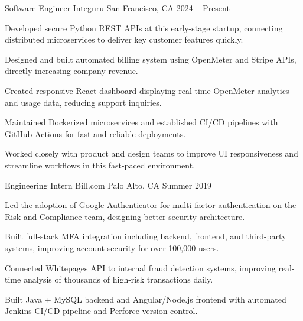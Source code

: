 \documentclass[12pt, letterpaper]{russell}
\begin{document}
\begin{cventries}

\cventry
  {Software Engineer} %
  {Integuru} %
  {San Francisco, CA} %
  {2024 -- Present} %
  {
\begin{cvitems}
  \item {Developed secure Python REST APIs at this early-stage startup, connecting distributed microservices to deliver key customer features quickly.}
  \item {Designed and built automated billing system using OpenMeter and Stripe APIs, directly increasing company revenue.}
  \item {Created responsive React dashboard displaying real-time OpenMeter analytics and usage data, reducing support inquiries.}
  \item {Maintained Dockerized microservices and established CI/CD pipelines with GitHub Actions for fast and reliable deployments.}
  \item {Worked closely with product and design teams to improve UI responsiveness and streamline workflows in this fast-paced environment.}
\end{cvitems}
}

\vspace{0.1cm}

  \cventry
    {Engineering Intern} %
    {Bill.com} %
    {Palo Alto, CA} %
    {Summer 2019} %
    {
\begin{cvitems}
  \item {Led the adoption of Google Authenticator for multi-factor authentication on the Risk and Compliance team, designing better security architecture.}
  \item {Built full-stack MFA integration including backend, frontend, and third-party systems, improving account security for over 100,000 users.}
  \item {Connected Whitepages API to internal fraud detection systems, improving real-time analysis of thousands of high-risk transactions daily.}
  \item {Built Java + MySQL backend and Angular/Node.js frontend with automated Jenkins CI/CD pipeline and Perforce version control.}
\end{cvitems}
    }


\end{cventries}
\end{document}
